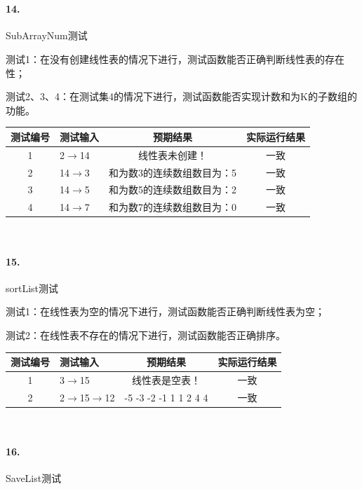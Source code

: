 \documentclass[supercite]{Experimental_Report}
\theoremstyle{definition}
\begin{document}
~\

\paragraph{14.}SubArrayNum测试
	
测试1：在没有创建线性表的情况下进行，测试函数能否正确判断线性表的存在性；

测试2、3、4：在测试集4的情况下进行，测试函数能否实现计数和为K的子数组的功能。

\vspace{0.5em}

\begin{tabular}{|c|p{2.7cm}|c|c|}
	\hline
	测试编号 & 测试输入 & 预期结果 & 实际运行结果 \\
	\hline
	1 & 2$\rightarrow$14 & 线性表未创建！ & 一致 \\
	\hline
	2 & 14$\rightarrow$3 & 和为数3的连续数组数目为：5 & 一致 \\
	\hline
	3 & 14$\rightarrow$5 & 和为数5的连续数组数目为：2 & 一致 \\
	\hline
	4 & 14$\rightarrow$7 & 和为数7的连续数组数目为：0 & 一致 \\
	\hline
\end{tabular}

~\

\paragraph{15.}sortList测试
	
测试1：在线性表为空的情况下进行，测试函数能否正确判断线性表为空；

测试2：在线性表不存在的情况下进行，测试函数能否正确排序。

\vspace{0.5em}

\begin{tabular}{|c|p{2.7cm}|c|c|}
	\hline
	测试编号 & 测试输入 & 预期结果 & 实际运行结果 \\
	\hline
	1 & 3$\rightarrow$15 & 线性表是空表！ & 一致 \\
	\hline
	2 & 2$\rightarrow$15$\rightarrow$12 & -5 -3 -2 -1 1 1 2 4 4 & 一致 \\
	\hline
\end{tabular}

~\

\paragraph{16.}SaveList测试
	
\end{document}
